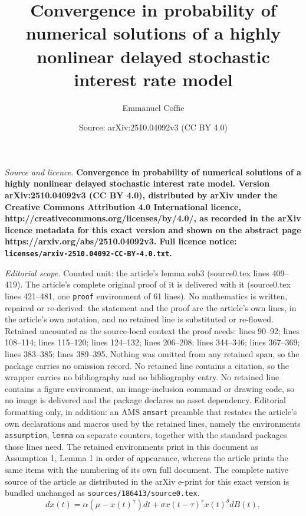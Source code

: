 \documentclass[10pt,a4paper]{amsart}
\title{\bf Convergence in probability of numerical solutions of a highly nonlinear delayed stochastic interest rate model}
\author{Emmanuel Coffie}
\date{Source: arXiv:2510.04092v3 (CC BY 4.0)}
\begin{document}
\maketitle

\noindent\emph{Source and licence.} \bf Convergence in probability of numerical solutions of a highly nonlinear delayed stochastic interest rate model. Version arXiv:2510.04092v3 (CC BY 4.0), distributed by arXiv under the Creative Commons Attribution 4.0 International licence, http://creativecommons.org/licenses/by/4.0/, as recorded in the arXiv licence metadata for this exact version and shown on the abstract page https://arxiv.org/abs/2510.04092v3. Full licence notice: \texttt{licenses/arxiv-2510.04092-CC-BY-4.0.txt}.\par\smallskip

\noindent\textit{Editorial scope.} Counted unit: the article's lemma sub3 (source0.tex lines 409--419). The article's complete original proof of it is delivered with it (source0.tex lines 421--481, one \texttt{proof} environment of 61 lines). No mathematics is written, repaired or re-derived: the statement and the proof are the article's own lines, in the article's own notation, and no retained line is substituted or re-flowed.  Retained uncounted as the source-local context the proof needs: lines 90--92; lines 108--114; lines 115--120; lines 124--132; lines 206--208; lines 344--346; lines 367--369; lines 383--385; lines 389--395.  Nothing was omitted from any retained span, so the package carries no omission record.  No retained line contains a citation, so the wrapper carries no bibliography and no bibliography entry.  No retained line contains a figure environment, an image-inclusion command or drawing code, so no image is delivered and the package declares no asset dependency.  Editorial formatting only, in addition: an AMS \texttt{amsart} preamble that restates the article's own declarations and macros used by the retained lines, namely the environments \texttt{assumption}, \texttt{lemma} on separate counters, together with the standard packages those lines need.  The retained environments print in this document as Assumption 1, Lemma 1 in order of appearance, whereas the article prints the same items with the numbering of its own full document.  The complete native source of the article as distributed in the arXiv e-print for this exact version is bundled unchanged as \texttt{sources/186413/source0.tex}.
\begin{equation}\label{cir4}
dx(t)=\alpha(\mu-x(t)^{\gamma})dt+\sigma x(t-\tau)^{r}x(t)^{\theta}dB(t),
\end{equation}
\end{document}
